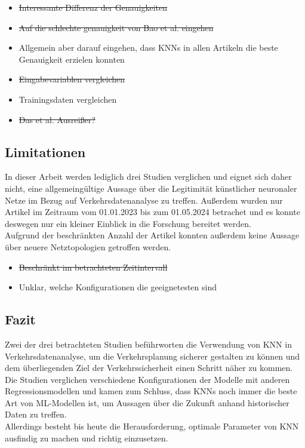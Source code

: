 \documentclass{scrartcl}
\begin{document}
\begin{itemize}
   \item{\sout{Interessante Differenz der Genauigkeiten}}
   \item{\sout{Auf die schlechte genauigkeit von Bao et al. eingehen}}
   \item{Allgemein aber darauf eingehen, dass KNNs in allen Artikeln die beste Genauigkeit erzielen konnten}
   \item{\sout{Eingabevariablen vergleichen}}
   \item{Trainingsdaten vergleichen}
   \item{\sout{Das et al. Ausreißer?}}
\end{itemize}

\subsection{Limitationen}

In dieser Arbeit werden lediglich drei Studien verglichen und eignet sich daher
nicht, eine allgemeingültige Aussage über die Legitimität künstlicher neuronaler
Netze im Bezug auf Verkehrsdatenanalyse zu treffen. Außerdem wurden nur
Artikel im Zeitraum vom 01.01.2023 bis zum 01.05.2024 betrachet und
es konnte deswegen nur ein kleiner Einblick in die Forschung bereitet werden.
\medskip \\
Aufgrund der beschränkten Anzahl der Artikel konnten außerdem keine Aussage
über neuere Netztopologien getroffen werden.

\begin{itemize}
   \item{\sout{Beschränkt im betrachteten Zeitintervall}}
   \item{Unklar, welche Konfigurationen die geeignetesten sind}
\end{itemize}

\subsection{Fazit}

Zwei der drei betrachteten Studien beführworten die Verwendung von KNN in
Verkehrsdatenanalyse, um die Verkehrsplanung sicherer gestalten zu können
und dem überliegenden Ziel der Verkehrssicherheit einen Schritt näher zu kommen.
Die Studien verglichen verschiedene Konfigurationen der Modelle mit anderen
Regressionsmodellen und kamen zum Schluss, dass KNNs noch immer die beste
Art von ML-Modellen ist, um Aussagen über die Zukunft anhand historischer
Daten zu treffen.
\medskip \\
Allerdings besteht bis heute die Herausforderung, optimale Parameter von
KNN ausfindig zu machen und richtig einzusetzen.
\end{document}
